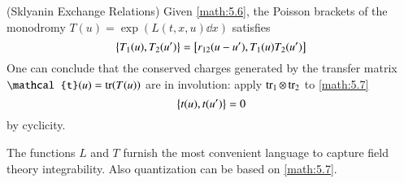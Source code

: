 \begin{theorem} (Sklyanin Exchange Relations)
	Given \eqref{math:5.6}, the Poisson brackets of the monodromy $T(u) = \exp(L(t, x, u) \dd{x})$	satisfies 
	\begin{equation}
		\pb{T_1(u)}{T_2(u')} =  \comm{r_{12}(u - u')}{T_1(u) T_2(u')}
		\label{math:5.7}
	\end{equation}
	One can conclude that the conserved charges generated by the transfer matrix $\mathcal{t}(u) = \tr(T(u))$ are in involution: apply $\tr_1 \otimes \tr_2$ to \eqref{math:5.7}
	\begin{equation*}
		\pb{t(u)}{t(u')} = 0
	\end{equation*}
	by cyclicity.
\end{theorem}

The functions $L$ and $T$ furnish the most convenient language to capture field theory integrability. Also quantization can be based on \eqref{math:5.7}.
